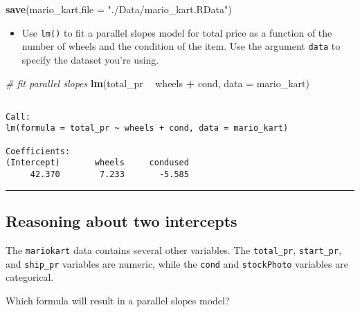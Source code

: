 \documentclass[
]{book}
\newenvironment{Shaded}{\begin{snugshade}}{\end{snugshade}}
\newcommand{\CommentTok}[1]{\textcolor[rgb]{0.56,0.35,0.01}{\textit{#1}}}
\newcommand{\DataTypeTok}[1]{\textcolor[rgb]{0.13,0.29,0.53}{#1}}
\newcommand{\KeywordTok}[1]{\textcolor[rgb]{0.13,0.29,0.53}{\textbf{#1}}}
\newcommand{\NormalTok}[1]{#1}
\newcommand{\OperatorTok}[1]{\textcolor[rgb]{0.81,0.36,0.00}{\textbf{#1}}}
\newcommand{\StringTok}[1]{\textcolor[rgb]{0.31,0.60,0.02}{#1}}
\providecommand{\tightlist}{%
  \setlength{\itemsep}{0pt}\setlength{\parskip}{0pt}}
\begin{document}
\begin{Shaded}
\begin{Highlighting}[]
\KeywordTok{save}\NormalTok{(mario_kart,}\DataTypeTok{file =} \StringTok{"./Data/mario_kart.RData"}\NormalTok{)}
\end{Highlighting}
\end{Shaded}

\begin{itemize}
\tightlist
\item
  Use \texttt{lm()} to fit a parallel slopes model for total price as a function of the number of wheels and the condition of the item. Use the argument \texttt{data} to specify the dataset you're using.
\end{itemize}

\begin{Shaded}
\begin{Highlighting}[]
\CommentTok{# fit parallel slopes}
\KeywordTok{lm}\NormalTok{(total_pr }\OperatorTok{~}\StringTok{ }\NormalTok{wheels }\OperatorTok{+}\StringTok{ }\NormalTok{cond, }\DataTypeTok{data =}\NormalTok{ mario_kart)}
\end{Highlighting}
\end{Shaded}

\begin{verbatim}

Call:
lm(formula = total_pr ~ wheels + cond, data = mario_kart)

Coefficients:
(Intercept)       wheels     condused  
     42.370        7.233       -5.585  
\end{verbatim}

\begin{center}\rule{0.5\linewidth}{0.5pt}\end{center}

\hypertarget{reasoning-about-two-intercepts}{%
\subsection*{Reasoning about two intercepts}\label{reasoning-about-two-intercepts}}

The \texttt{mariokart} data contains several other variables. The \texttt{total\_pr}, \texttt{start\_pr}, and \texttt{ship\_pr} variables are numeric, while the \texttt{cond} and \texttt{stockPhoto} variables are categorical.

Which formula will result in a parallel slopes model?
\end{document}
